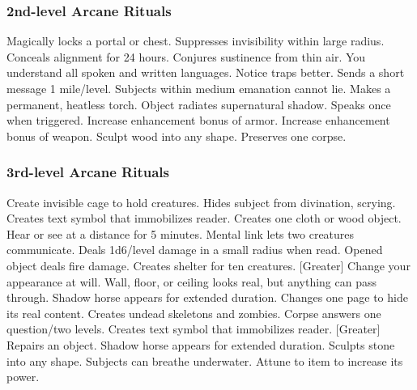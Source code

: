 \subsubsection{2nd-level Arcane Rituals}
\begin{rituallist}
     Magically locks a portal or chest.
     Suppresses invisibility within large radius.
     Conceals alignment for 24 hours.
     Conjures sustinence from thin air.
     You understand all spoken and written languages.
     Notice traps better.
     Sends a short message 1 mile/level.
     Subjects within medium emanation cannot lie.
     Makes a permanent, heatless torch.
     Object radiates supernatural shadow.
     Speaks once when triggered.
     Increase enhancement bonus of armor.
     Increase enhancement bonus of weapon.
     Sculpt wood into any shape.
     Preserves one corpse.
\end{rituallist}

\subsubsection{3rd-level Arcane Rituals}
\begin{rituallist}
     Create invisible cage to hold creatures.
     Hides subject from divination, scrying.
     Creates text symbol that immobilizes reader.
     Creates one cloth or wood object.
     Hear or see at a distance for 5 minutes.
     Mental link lets two creatures communicate.
     Deals 1d6/level damage in a small radius when read.
     Opened object deals fire damage.
     Creates shelter for ten creatures.
    [Greater] Change your appearance at will.
     Wall, floor, or ceiling looks real, but anything can pass through.
     Shadow horse appears for extended duration.
     Changes one page to hide its real content.
     Creates undead skeletons and zombies.
     Corpse answers one question/two levels.
     Creates text symbol that immobilizes reader.
    [Greater] Repairs an object.
     Shadow horse appears for extended duration.
     Sculpts stone into any shape.
     Subjects can breathe underwater.
     Attune to item to increase its power.
\end{rituallist}

